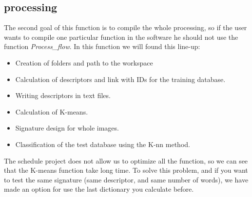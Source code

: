 \documentclass[12pt]{article}
\begin{document}
\subsection{processing}

The second goal of this function is to compile the whole processing, so if the user wants to compile one particular function in the software he should not use the function \textit{Process\_flow}. In this function we will found this line-up:

\begin{itemize}
\item Creation of folders and path to the workspace 
\item Calculation of descriptors and link with IDs for the training database.
\item Writing descriptors in text files.
\item Calculation of K-means.
\item Signature design for whole images.
\item Classification of the test database using the K-nn method. 
\end{itemize}

The schedule project does not allow us to optimize all the function, so we can see that the K-means function take long time. To solve this problem, and if you want to test the same signature (same descriptor, and same number of words), we have made an option for use the last dictionary you calculate before.

\end{document}
